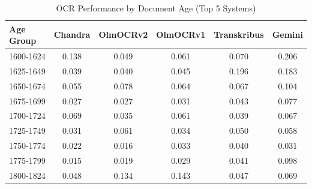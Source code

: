 \begin{table}[htbp]
\centering
\caption{OCR Performance by Document Age (Top 5 Systems)}
\label{tab:performance_by_age}
\begin{tabular}{lccccc}
\toprule
\textbf{Age Group} & \textbf{Chandra} & \textbf{OlmOCRv2} & \textbf{OlmOCRv1} & \textbf{Transkribus} & \textbf{Gemini} \\
\midrule
1600-1624 & 0.138 & 0.049 & 0.061 & 0.070 & 0.206 \\
1625-1649 & 0.039 & 0.040 & 0.045 & 0.196 & 0.183 \\
1650-1674 & 0.055 & 0.078 & 0.064 & 0.067 & 0.104 \\
1675-1699 & 0.027 & 0.027 & 0.031 & 0.043 & 0.077 \\
1700-1724 & 0.069 & 0.035 & 0.061 & 0.039 & 0.067 \\
1725-1749 & 0.031 & 0.061 & 0.034 & 0.050 & 0.058 \\
1750-1774 & 0.022 & 0.016 & 0.033 & 0.040 & 0.031 \\
1775-1799 & 0.015 & 0.019 & 0.029 & 0.041 & 0.098 \\
1800-1824 & 0.048 & 0.134 & 0.143 & 0.047 & 0.069 \\
\bottomrule
\end{tabular}
\end{table}
